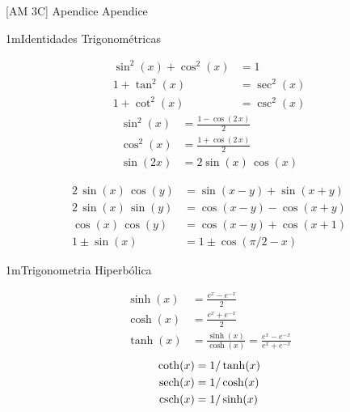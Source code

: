 \documentclass["AM3C-Slides_annotations.tex"]{subfiles}
\begin{document}

[AM 3C]
{Apendice} %
{Apendice} %

\begin{sectionBox}1m{Identidades Trigonométricas} %
  \begin{multicols}{2}
    \begin{align}
        \sin^2(x) + \cos^2(x) &= 1
      \\ 1 + \tan^2(x)         &= \sec^2(x)
      \\ 1 + \cot^2(x)         &= \csc^2(x)
    \end{align}
    \begin{align}
         \sin^2(x)             &= \frac{1-\cos(2\,x)}{2}
      \\ \cos^2(x)             &= \frac{1+\cos(2\,x)}{2}
      \\ \sin(2x)              &= 2 \sin(x)\,\cos(x)
    \end{align}
  \end{multicols}
  \begin{align}
       2\,\sin(x)\,\cos(y)   &= \sin(x - y) + \sin(x + y)
    \\ 2\,\sin(x)\,\sin(y)   &= \cos(x - y) - \cos(x + y)
    \\ \cos(x)\,\cos(y)      &= \cos(x - y) + \cos(x + 1)
    \\ 1 \pm \sin(x)           &= 1 \pm \cos(\pi/2 - x)
  \end{align}
\end{sectionBox}

\begin{sectionBox}1m{Trigonometria Hiperbólica} %
  \begin{multicols}{2}
    \begin{align}
         \sinh(x) &= \frac{e^{x}-e^{-x}}{2}
      \\ \cosh(x) &= \frac{e^{x}+e^{-x}}{2}
      \\ \tanh(x) &= \frac{\sinh(x)}{\cosh(x)}=\frac{e^{x}-e^{-x}}{e^{x}+e^{-x}}
    \end{align}
    \begin{align}
         \coth(x) &= 1/\tanh(x)
      \\ \operatorname{sech}(x) &= 1/\cosh(x)
      \\ \operatorname{csch}(x) &= 1/\sinh(x)
    \end{align}
  \end{multicols}
\end{sectionBox}
\end{document}
